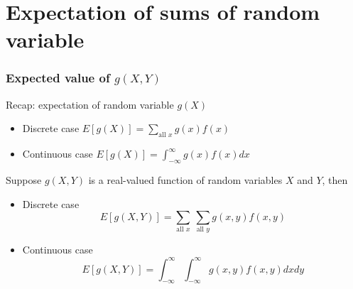 \documentclass[slidestop,compress,mathserif]{beamer}
\begin{document}
%

%
%








\section{Expectation of sums of random variable}
\begin{frame}
\frametitle{Expected value of $g(X, Y)$}
Recap: expectation of random variable $g(X)$
\begin{itemize}
\item Discrete case $E[g(X)] = \sum_{\text{all } x} g(x) f(x)$
\item Continuous case $E[g(X)] = \int_{-\infty}^{\infty} g(x)f(x) dx$
\end{itemize}
\pause

Suppose $g(X,Y)$ is a real-valued function of random variables $X$ and $Y$, then

\begin{itemize}
\item Discrete case
\[E[g(X, Y)] = \sum_{\text{all } x}~\sum_{\text{all } y} g(x,y) f(x, y)\]
\item Continuous case
\[E[g(X, Y)] = \int_{-\infty}^{\infty}\int_{-\infty}^{\infty} g(x,y) f(x, y)dxdy\]
\end{itemize}


\end{frame}

\end{document}

